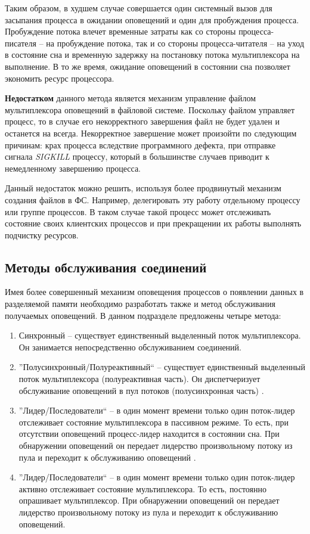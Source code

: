 Таким образом, в худшем случае совершается один системный вызов для засыпания процесса в ожидании оповещений и один для пробуждения процесса. Пробуждение потока влечет временные затраты как со стороны процесса-писателя -- на пробуждение потока, так и со стороны процесса-читателя -- на уход в состояние сна и временную задержку на постановку потока мультиплексора на выполнение. В то же время, ожидание оповещений в состоянии сна позволяет экономить ресурс процессора.

\textbf{Недостатком} данного метода является механизм управление файлом мультиплексора оповещений в файловой системе. Поскольку файлом управляет процесс, то в случае его некорректного завершения файл не будет удален и останется на всегда. Некорректное завершение может произойти по следующим причинам: крах процесса вследствие программного дефекта, при отправке сигнала \textit{SIGKILL} процессу, который в большинстве случаев приводит к немедленному завершению процесса.

Данный недостаток можно решить, используя более продвинутый механизм создания файлов в ФС. Например, делегировать эту работу отдельному процессу или группе процессов. В таком случае такой процесс может отслеживать состояние своих клиентских процессов и при прекращении их работы выполнять подчистку ресурсов.

\subsection{Методы обслуживания соединений}

Имея более совершенный механизм оповещения процессов о появлении данных в разделяемой памяти необходимо разработать также и метод обслуживания получаемых оповещений. В данном подразделе предложены четыре метода:
\begin{enumerate}
\item Синхронный -- существует единственный выделенный поток мультиплексора. Он занимается непосредственно обслуживанием соединений.
\item ''Полусинхронный/Полуреактивный`` -- существует единственный выделенный поток мультиплексора (полуреактивная часть). Он диспетчеризует обслуживание оповещений в пул потоков (полусинхронная часть) \cite{schmidt1995half}.
\item ''Лидер/Последователи`` -- в один момент времени только один поток-лидер отслеживает состояние мультиплексора в пассивном режиме. То есть, при отсутствии оповещений процесс-лидер находится в состоянии сна. При обнаружении оповещений он передает лидерство произвольному потоку из пула и переходит к обслуживанию оповещений \cite{schmidt1998leader}.
\item ''Лидер/Последователи`` -- в один момент времени только один поток-лидер активно отслеживает состояние мультиплексора. То есть, постоянно опрашивает мультиплексор. При обнаружении оповещений он передает лидерство произвольному потоку из пула и переходит к обслуживанию оповещений.
\end{enumerate}

